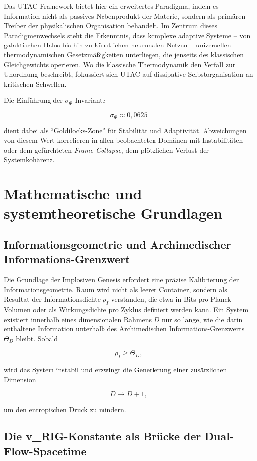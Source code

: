 \documentclass[11pt,a4paper]{article}
\begin{document}
Das UTAC-Framework bietet hier ein erweitertes Paradigma, indem es Information nicht als passives Nebenprodukt der Materie, sondern als primären Treiber der physikalischen Organisation behandelt. Im Zentrum dieses Paradigmenwechsels steht die Erkenntnis, dass komplexe adaptive Systeme – von galaktischen Halos bis hin zu künstlichen neuronalen Netzen – universellen thermodynamischen Gesetzmäßigkeiten unterliegen, die jenseits des klassischen Gleichgewichts operieren. Wo die klassische Thermodynamik den Verfall zur Unordnung beschreibt, fokussiert sich UTAC auf dissipative Selbstorganisation an kritischen Schwellen.

Die Einführung der $\sigma_{\Phi}$-Invariante


\[
\sigma_{\Phi} \approx 0{,}0625
\]


dient dabei als ``Goldilocks-Zone'' für Stabilität und Adaptivität. Abweichungen von diesem Wert korrelieren in allen beobachteten Domänen mit Instabilitäten oder dem gefürchteten \emph{Frame Collapse}, dem plötzlichen Verlust der Systemkohärenz.

\section{Mathematische und systemtheoretische Grundlagen}

\subsection{Informationsgeometrie und Archimedischer Informations-Grenzwert}

Die Grundlage der Implosiven Genesis erfordert eine präzise Kalibrierung der Informationsgeometrie. Raum wird nicht als leerer Container, sondern als Resultat der Informationsdichte $\rho_I$ verstanden, die etwa in Bits pro Planck-Volumen oder als Wirkungsdichte pro Zyklus definiert werden kann. Ein System existiert innerhalb eines dimensionalen Rahmens $D$ nur so lange, wie die darin enthaltene Information unterhalb des Archimedischen Informations-Grenzwerts $\Theta_D$ bleibt. Sobald


\[
\rho_I \ge \Theta_D,
\]


wird das System instabil und erzwingt die Generierung einer zusätzlichen Dimension


\[
D \longrightarrow D+1,
\]


um den entropischen Druck zu mindern.

\subsection{Die v\_RIG-Konstante als Brücke der Dual-Flow-Spacetime}
\end{document}
